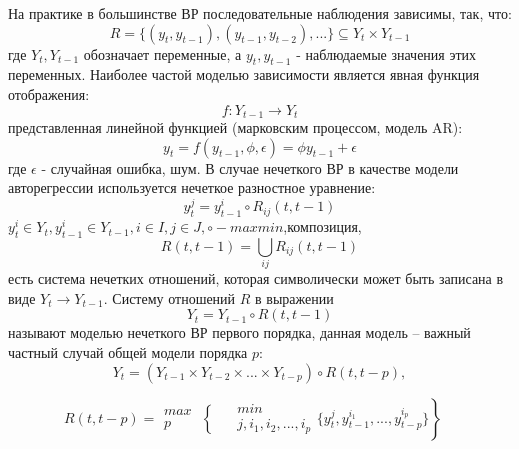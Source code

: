 На практике в большинстве ВР последовательные наблюдения зависимы, так, что:
\begin{equation}
	R= \lbrace (y_t, y_{t-1}), (y_{t-1}, y_{t-2}),... \rbrace \subseteq Y_t \times Y_{t-1}
\end{equation}
где $Y_t, Y_{t-1}$ обозначает переменные, а $y_t, y_{t-1}$ - наблюдаемые значения этих переменных. Наиболее частой моделью зависимости является явная функция отображения:
\begin{equation}
	f:Y_{t-1} \to Y_t
\end{equation} 
представленная линейной функцией (марковским процессом, модель AR):
\begin{equation}
	y_t = f (y_{t-1}, \phi, \epsilon) = \phi y_{t-1} + \epsilon
\end{equation}
где $\epsilon$ - случайная ошибка, шум.
В случае нечеткого ВР  в качестве модели авторегрессии используется нечеткое разностное уравнение:
\begin{equation}
	y_t^j = y_{t-1}^i \circ R_{ij}(t, t-1)
\end{equation}
$y_t^i \in Y_t, y_{t-1}^i \in Y_{t-1}, i \in I, j \in J, \circ - max min$,композиция, 
\begin{equation}
	R(t, t-1) = 	\bigcup_{ij} R_{ij}(t, t-1)
\end{equation}
есть система нечетких отношений, которая символически может быть записана в виде $Y_t \to Y_{t-1}$.
Систему отношений $R$ в выражении 
\begin{equation}
	Y_t = Y_{t-1} \circ R(t, t-1)
\end{equation}
называют моделью нечеткого ВР первого порядка, данная модель – важный частный случай общей модели порядка $p$:
\begin{equation}
	Y_t = (Y_{t-1} \times Y_{t-2} \times ... \times Y_{t-p}) \circ R(t, t-p),
\end{equation}

\begin{equation*}
	R(t, t-p)= \left. \begin{aligned}
	max \\
	p
\end{aligned} \right\{
\quad 
\left. \begin{aligned}
	min \\
	j, i_1, i_2,...,i_p
\end{aligned} \{y^j_t,y^{i_1}_{t-1},...,y^{i_p}_{t-p} \} \right \}
\quad 
\end{equation*}


